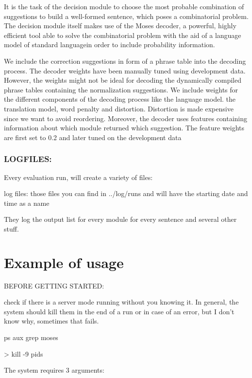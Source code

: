 \documentclass[letterpaper,10pt,english]{sphinxmanual}
\begin{document}
It is the task of the decision module to choose the most probable combination of suggestions  to build a well-formed sentence, which poses a combinatorial problem. The decision module itself makes use of the Moses decoder, a powerful, highly efficient tool able to solve the combinatorial problem with the aid of a language model of standard languagein order to include probability information.

We include the correction suggestions in form of a phrase table into the decoding process. The decoder weights have been manually tuned using development data. However, the weights might not be ideal for decoding the dynamically compiled phrase tables containing the normalization suggestions. We include weights for the different components of the decoding process like the language model. the translation model, word penalty and distortion. Distortion is made expensive since we want to avoid reordering. Moreover, the decoder uses features containing information about which module returned which suggestion. The feature weights are first set to 0.2 and later tuned on the development data


\subsubsection{LOGFILES:}
\label{\detokenize{README:logfiles}}
Every evaluation run, will create a variety of files:

log files: those files you can find in ../log/runs and will have the starting date and time as a name

They log the output list for every module for every sentence and several other stuff.


\section{Example of usage}
\label{\detokenize{README:example-of-usage}}
BEFORE GETTING STARTED:

check if there is a server mode running without you knowing it. In general, the system should
kill them in the end of a run or in case of an error, but I don’t know why, sometimes that fails.

ps aux \textbar{} grep moses

\textendash{}\textgreater{} kill -9 pids

The system requires 3 arguments:

\begin{sphinxVerbatim}[commandchars=\\\{\}]
   
\end{sphinxVerbatim}
\end{document}
